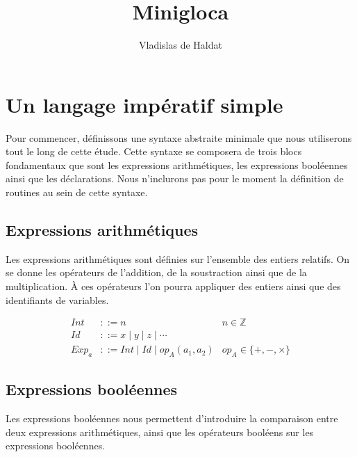 \documentclass[a4paper, 12pt]{article}
\title{Minigloca}
\author{Vladislas de Haldat}
\begin{document}


\maketitle
\newpage
\tableofcontents
\newpage

\section{Un langage impératif simple}
Pour commencer, définissons une syntaxe abstraite minimale que nous utiliserons tout le long de cette étude.
Cette syntaxe se composera de trois blocs fondamentaux que sont les expressions arithmétiques, les expressions
booléennes ainsi que les déclarations. Nous n'inclurons pas pour le moment la définition de routines au sein de cette syntaxe.

\subsection{Expressions arithmétiques}
Les expressions arithmétiques sont définies sur l'ensemble des entiers relatifs. On se donne les opérateurs
de l'addition, de la soustraction ainsi que de la multiplication. À ces opérateurs l'on pourra appliquer des
entiers ainsi que des identifiants de variables.


\begin{align*}
  Int   & ::= n                               & n \in \mathbb{Z}          \\
  Id    & ::= x \mid y \mid z \mid \cdots                                 \\
  Exp_a & ::= Int \mid Id \mid op_A(a_1, a_2) & op_A \in \{+, -, \times\}
\end{align*}

\subsection{Expressions booléennes}
Les expressions booléennes nous permettent d'introduire la comparaison entre deux expressions arithmétiques,
ainsi que les opérateurs booléens sur les expressions booléennes.
\end{document}
